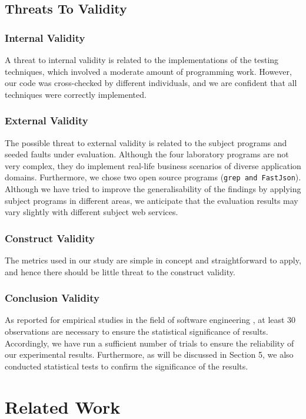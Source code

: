 \documentclass[10pt,journal,compsoc]{IEEEtran}
\begin{document}
\subsection{Threats To Validity}

\subsubsection{Internal Validity}
A threat to internal validity is related to the implementations of the testing techniques, which involved a moderate
amount of programming work. However, our code was cross-checked by different individuals, and we are confident that all techniques were correctly implemented.

\subsubsection{External Validity}
The possible threat to external validity is related to the subject programs and seeded faults under evaluation. Although
the four laboratory programs are not very complex, they do implement real-life business scenarios of diverse application
domains. Furthermore, we chose two open source programs (\texttt{grep and FastJson}). Although we have tried to improve the generalisability of the findings by applying subject programs in different areas, we anticipate that the evaluation results may vary slightly with different subject web services.

\subsubsection{Construct Validity}
The metrics used in our study are simple in concept and straightforward to apply, and hence there should be little
threat to the construct validity.

\subsubsection{Conclusion Validity}
As reported for empirical studies in the field of software engineering \cite{arcuri2011practical}, at least 30 observations are necessary to ensure the statistical significance of results. Accordingly, we have run a sufficient number of trials to ensure the
reliability of our experimental results. Furthermore, as will be discussed in Section 5, we also conducted statistical tests
to confirm the significance of the results.

\section{Related Work}
\label{sec:relatedwork}
\end{document}
